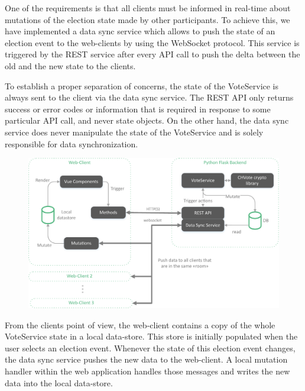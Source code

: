 One of the requirements is that all clients must be informed in real-time about mutations of the election state made by other participants. To achieve this, we have implemented a data sync service which allows to push the state of an election event to the web-clients by using the WebSocket protocol. This service is triggered by the REST service after every API call to push the delta between the old and the new state to the clients.

To establish a proper separation of concerns, the state of the VoteService is always sent to the client via the data sync service. The REST API only returns success or error codes or information that is required in response to some particular API call, and never state objects. On the other hand, the data sync service does never manipulate the state of the VoteService and is solely responsible for data synchronization.

\begin{figure}[h!]
\begin{center}
\includegraphics[scale=0.7]{assets/chvoteArchitecture.pdf}
\label{Architecture}%
\end{center}
\end{figure}

From the clients point of view, the web-client contains a copy of the whole VoteService state in a local data-store. This store is initially populated when the user selects an election event. Whenever the state of this election event changes, the data sync service pushes the new data to the web-client. A local mutation handler within the web application handles those messages and writes the new data into the local data-store.

